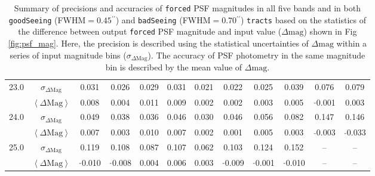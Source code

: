 \documentclass[useamsfonts]{pasj01}
\def\asec{$^{\prime\prime}$}
\def\forced{\texttt{forced}}
\def\tracts{\texttt{tracts}}
\newcommand{\minus}{\raisebox{.4\height}{\scalebox{.8}{-}}}
\newcommand{\smag}{$\sigma_{\Delta\mathrm{Mag}}$}
\newcommand{\mmag}{$\left<{\Delta\mathrm{Mag}}\right>$}
\newcommand{\n}{$\minus$}
\begin{document}
\begin{table}
\begin{center}
\begin{tabular}{| c | c | c | c | c | c | c | c | c | c | c | c |}
    \rowcolor[gray]{.85} 23.0 & \smag{} & 0.031 & 0.026  & 0.029 & 0.031 & 0.021 & 0.022 & 0.025 & 0.039 &   0.076 & 0.079 \\
    \rowcolor[gray]{.85}      & \mmag{} & 0.008 & 0.004  & 0.011 & 0.009 & 0.002 & 0.002 & 0.003 & 0.005 & \n0.001 & 0.003 \\
    \hline 
    
    \rowcolor[gray]{1.0} 24.0 & \smag{} & 0.049 & 0.038  & 0.036 & 0.046 & 0.030 & 0.046 & 0.056 & 0.082 &   0.147 &   0.146 \\
    \rowcolor[gray]{1.0}      & \mmag{} & 0.007 & 0.003  & 0.010 & 0.007 & 0.002 & 0.001 & 0.005 & 0.003 & \n0.003 & \n0.033 \\
    \hline

    \rowcolor[gray]{.85} 25.0 & \smag{} &   0.119 &   0.108  & 0.087 & 0.107 & 0.062 &   0.103 &   0.124 &   0.152 & -- & -- \\
    \rowcolor[gray]{.85}      & \mmag{} & \n0.010 & \n0.008  & 0.004 & 0.006 & 0.003 & \n0.009 & \n0.001 & \n0.010 & -- & -- \\
    \hline 
        
    \end{tabular}
    \end{center}
    \caption{
        Summary of precisions and accuracies of \forced{} PSF magnitudes in all 
        five bands and in both \texttt{goodSeeing} (FWHM$=0.45$\asec{}) and
        \texttt{badSeeing} (FWHM$=0.70$\asec{}) \tracts{} based on the statistics of 
        the difference between output \forced{} PSF magnitude and input 
        value ($\Delta\mathrm{mag}$) shown in Fig \ref{fig:psf_mag}.
        Here, the precision is described using the statistical uncertainties of 
        $\Delta\mathrm{mag}$ within a series of input magnitude bins (\smag{}). 
        The accuracy of PSF photometry in the same magnitude bin is described by the 
        mean value of $\Delta\mathrm{mag}$.
        }
        \label{tab:psfmag}
\end{table}
\end{document}
